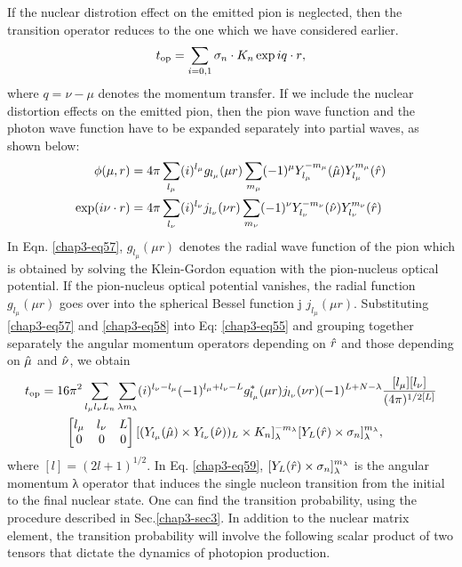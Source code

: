 If the nuclear distrotion effect on the emitted pion is neglected, then the transition operator reduces to the one which we have considered earlier.
\begin{equation}
t_{\text{op}} = \sum_{i=0, 1} \sigma_n \cdot {\boldmath K}_n \exp i {\boldmath q \cdot r}, \label{chap3-eq56}
\end{equation}
where $q= \nu -\mu$ denotes the momentum transfer. If we include the nuclear distortion effects on the emitted pion, then the pion wave function and the photon wave function have to be expanded separately into partial waves, as shown below:
\begin{align}
  \phi (\mu , {\boldmath r}) & = 4 \pi \sum_{l_{\mu}} (i)^{l_\mu} g_{l_\mu}(\mu r)\sum_{m_\mu} (-1)^\mu Y_{l_\mu}^{-m _\mu} ({\boldmath \hat{\mu}}) Y_{l_\mu}^{m_\mu} ({\boldmath \hat{r}}) \label{chap3=eq57}\\
  \exp (i \nu \cdot {\boldmath r}) & = 4 \pi \sum_{l_\nu} (i)^{l_\nu} j_{l_\nu} (\nu r) \sum_{m_\nu} (-1)^\nu Y_{l_\nu}^{-m_\nu} ({\boldmath \hat{\nu}}) Y_{l_\nu}^{m_\nu} ({\boldmath \hat{r}}) \label{chap3-eq58}
\end{align}
In Eqn. \eqref{chap3-eq57}, $g_{l_\mu} (\mu r)$ denotes the radial wave function of the pion which is obtained by solving the Klein-Gordon equation with the pion-nucleus optical potential. If the pion-nucleus optical potential vanishes, the radial function $g_{l_\mu}(\mu r)$ goes over into the spherical Bessel function j $j_{l_\mu}(\mu r)$. Substituting \eqref{chap3-eq57} and \eqref{chap3-eq58} into Eq: \eqref{chap3-eq55} and grouping together separately the angular momentum operators depending on ${\boldmath \hat{r}}$ and those depending on ${\boldmath \hat{\mu}}$ and ${\boldmath \hat{\nu}}$, we obtain
\begin{align}
  t_{\text{op}} & = 16\pi^2 \sum_{l_\mu l_\nu L_n} \sum_{\lambda m_\lambda} (i)^{l_\nu - l_\mu} (-1)^{l_\mu + l_\nu - L} g_{l_\mu}^\ast (\mu r)j_{l_\nu} (\nu r) (-1)^{L+N-\lambda} \frac{[l_\mu][l_\nu]}{(4 \pi)^{1/2 [L]}}\notag\\
  & \qquad \begin{bmatrix} l_\mu & l_\nu & L\\ 0 & 0 & 0   \end{bmatrix} [(Y_{l_\mu}(\hat{\mu}) \times Y_{l_\nu} (\hat{\nu}))_L \times {\boldmath K}_n]_\lambda^{-m_\lambda} [Y_L ({\boldmath \hat{r}}) \times \sigma_n]_{\lambda}^{m_\lambda}, \label{chap3-eq59}
\end{align}
where $[l] = (2l+1)^{1/2}$. In Eq. \eqref{chap3-eq59}, $[Y_L ({\boldmath \hat{r}}) \times \sigma_n]_\lambda^{m_\lambda}$ is the angular momentum λ operator that induces the single nucleon transition from the initial to the final nuclear state. One can find the transition probability, using the procedure described in Sec.\ref{chap3-sec3}. In addition to the nuclear matrix element, the transition probability will involve the following scalar product of two tensors that dictate the dynamics of photopion production.
